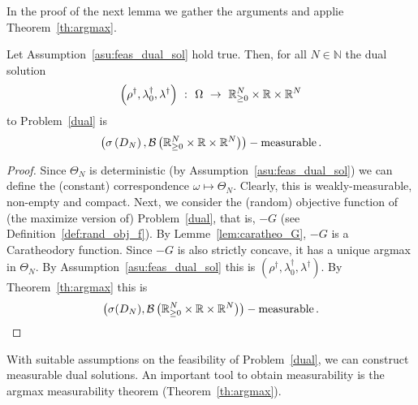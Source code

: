   In the proof of the next lemma we gather the arguments and applie Theorem~\ref{th:argmax}.
\begin{lemma}
  \label{lem:meas_dual_sol}
  Let Assumption~\ref{asu:feas_dual_sol} hold true.
  Then,
  for all $N\in\mathbb{N}$ the dual solution
  \begin{align*}
  \left( \rho^\dagger,\lambda_0^\dagger,\lambda^\dagger \right)
    \ 
    \colon
   \  
    \Omega
    \ 
    \to
    \ 
  \R^N_{\ge 0}
  \times
  \R
  \times
  \R^{N}
  \end{align*}
  to
  Problem~\ref{dual} 
  is
  \begin{align*}
  \left(
    \sigma \left( D_N \right),\mathcal{B}
  \left(
  \mathbb{R}^N_{\ge 0}
  \times
  \mathbb{R}
  \times
  \mathbb{R}^{N}
  \right)
  \right)
  -\text{measurable}
  \,.
  \end{align*}
\end{lemma}
\begin{proof}
  Since $\Theta_N$ is deterministic (by Assumption~\ref{asu:feas_dual_sol})
  we can define the (constant) correspondence
  $\omega \mapsto \Theta_N$.
  Clearly, this is weakly-measurable, non-empty and compact.
  Next, we consider the (random) objective function of (the maximize version of) Problem~\ref{dual}, that is, $-G$ (see Definition~\ref{def:rand_obj_f}).
  By Lemme~\ref{lem:caratheo_G}, $-G$  is a Caratheodory function.
  Since $-G$ is also strictly concave, it has a unique argmax in $\Theta_N$.
  By Assumption~\ref{asu:feas_dual_sol} this is 
  $
  \left( \rho^\dagger,\lambda_0^\dagger,\lambda^\dagger \right)
  $.
  By Theorem~\ref{th:argmax} this is
  \begin{align*}
  \left(
    \sigma
    (D_N)
    ,\mathcal{B}
  \left(
  \mathbb{R}^N_{\ge 0}
  \times
  \mathbb{R}
  \times
  \mathbb{R}^{N}
  \right)
  \right)
  -\text{measurable}
  \,.
  \end{align*}
\end{proof}

\begin{takeaways}
  With suitable assumptions on the feasibility of Problem~\ref{dual}, we can construct measurable dual solutions.
  An important tool to obtain measurability is the argmax measurability theorem (Theorem~\ref{th:argmax}).
\end{takeaways}

